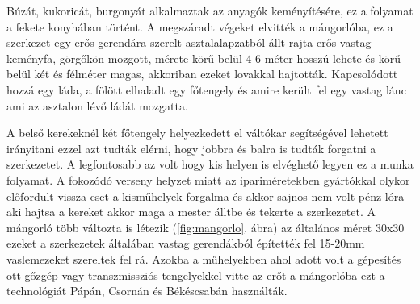 Búzát, kukoricát, burgonyát alkalmaztak az anyagók keményítésére, ez a folyamat a fekete konyhában történt. A megszáradt végeket elvitték a mángorlóba, ez a szerkezet  egy erős gerendára szerelt asztalalapzatból állt rajta erős vastag keményfa, görgőkön mozgott, mérete körű belül 4-6 méter hosszú lehete és körű belül két és félméter magas, akkoriban ezeket lovakkal hajtották. Kapcsolódott hozzá egy láda, a fölött elhaladt egy főtengely és amire került fel egy vastag lánc ami az asztalon lévő ládát mozgatta.

A belső kerekeknél két főtengely helyezkedett el váltókar segítségével lehetett irányitani ezzel azt tudták elérni, hogy jobbra és balra is tudták forgatni a szerkezetet. A legfontosabb az volt hogy kis helyen is elvéghető legyen ez a munka folyamat. A fokozódó verseny helyzet miatt az ipariméretekben gyártókkal olykor előfordult vissza eset a kisműhelyek forgalma és akkor sajnos nem volt pénz lóra aki hajtsa a kereket akkor maga a mester álltbe és tekerte a szerkezetet. A mángorló több változta is létezik (\ref{fig:mangorlo}. ábra) az általános méret 30x30  ezeket a szerkezetek általában vastag gerendákból építették fel 15-20mm vaslemezeket szereltek fel rá.
Azokba a műhelyekben ahol adott volt a gépesítés ott gőzgép vagy transzmissziós tengelyekkel vitte az erőt a mángorlóba ezt a technológiát Pápán, Csornán és  Békéscsabán használták.

